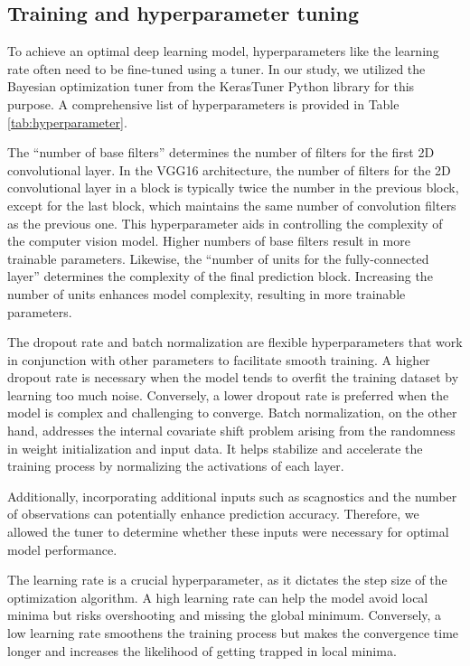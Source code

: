 \documentclass[]{interact}
\theoremstyle{plain}%
\theoremstyle{definition}
\theoremstyle{remark}
\begin{document}
\hypertarget{training-and-hyperparameter-tuning}{%
\subsection{Training and hyperparameter
tuning}\label{training-and-hyperparameter-tuning}}

To achieve an optimal deep learning model, hyperparameters like the
learning rate often need to be fine-tuned using a tuner. In our study,
we utilized the Bayesian optimization tuner from the KerasTuner Python
library \citep{omalley2019kerastuner} for this purpose. A comprehensive
list of hyperparameters is provided in Table \ref{tab:hyperparameter}.

The ``number of base filters'' determines the number of filters for the
first 2D convolutional layer. In the VGG16 architecture, the number of
filters for the 2D convolutional layer in a block is typically twice the
number in the previous block, except for the last block, which maintains
the same number of convolution filters as the previous one. This
hyperparameter aids in controlling the complexity of the computer vision
model. Higher numbers of base filters result in more trainable
parameters. Likewise, the ``number of units for the fully-connected
layer'' determines the complexity of the final prediction block.
Increasing the number of units enhances model complexity, resulting in
more trainable parameters.

The dropout rate and batch normalization are flexible hyperparameters
that work in conjunction with other parameters to facilitate smooth
training. A higher dropout rate is necessary when the model tends to
overfit the training dataset by learning too much noise. Conversely, a
lower dropout rate is preferred when the model is complex and
challenging to converge. Batch normalization, on the other hand,
addresses the internal covariate shift problem arising from the
randomness in weight initialization and input data. It helps stabilize
and accelerate the training process by normalizing the activations of
each layer.

Additionally, incorporating additional inputs such as scagnostics and
the number of observations can potentially enhance prediction accuracy.
Therefore, we allowed the tuner to determine whether these inputs were
necessary for optimal model performance.

The learning rate is a crucial hyperparameter, as it dictates the step
size of the optimization algorithm. A high learning rate can help the
model avoid local minima but risks overshooting and missing the global
minimum. Conversely, a low learning rate smoothens the training process
but makes the convergence time longer and increases the likelihood of
getting trapped in local minima.
\end{document}
